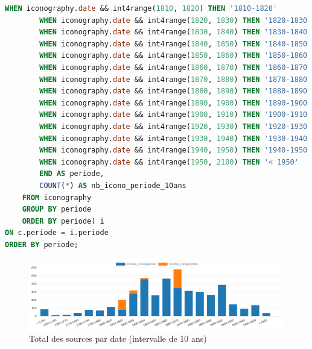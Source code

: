 \begin{enumerate}
\begin{enumerate}
\begin{lstlisting}[language=SQL, caption=Nombre de sources par date (10 ans)]
        WHEN iconography.date && int4range(1810, 1820) THEN '1810-1820' 
        WHEN iconography.date && int4range(1820, 1830) THEN '1820-1830' 
        WHEN iconography.date && int4range(1830, 1840) THEN '1830-1840' 
        WHEN iconography.date && int4range(1840, 1850) THEN '1840-1850' 
        WHEN iconography.date && int4range(1850, 1860) THEN '1850-1860' 
        WHEN iconography.date && int4range(1860, 1870) THEN '1860-1870' 
        WHEN iconography.date && int4range(1870, 1880) THEN '1870-1880' 
        WHEN iconography.date && int4range(1880, 1890) THEN '1880-1890' 
        WHEN iconography.date && int4range(1890, 1900) THEN '1890-1900' 
        WHEN iconography.date && int4range(1900, 1910) THEN '1900-1910' 
        WHEN iconography.date && int4range(1920, 1930) THEN '1920-1930' 
        WHEN iconography.date && int4range(1930, 1940) THEN '1930-1940' 
        WHEN iconography.date && int4range(1940, 1950) THEN '1940-1950' 
        WHEN iconography.date && int4range(1950, 2100) THEN '< 1950' 
        END AS periode, 
        COUNT(*) AS nb_icono_periode_10ans
    FROM iconography 
    GROUP BY periode 
    ORDER BY periode) i
ON c.periode = i.periode
ORDER BY periode; \end{lstlisting}
\begin{figure}[ht!]
        \centering
        \includegraphics[width=1\linewidth]{images/graphiques/total_source_date_10.png}
        \caption{Total des sources par date (intervalle de 10 ans)}
        \label{fig:total_sources_date10}
    \end{figure}
        \end{enumerate}
\end{enumerate}
